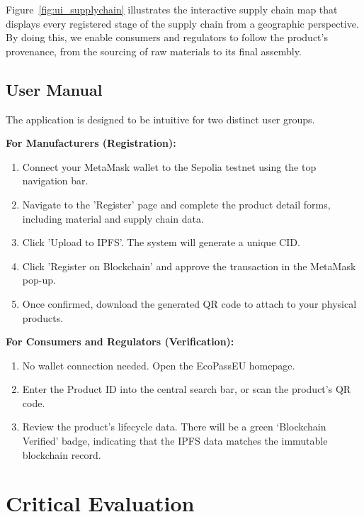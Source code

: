 \documentclass[runningheads]{llncs}
\begin{document}
	Figure~\ref{fig:ui_supplychain} illustrates the interactive supply chain 
	map that displays every registered stage of the supply chain from a 
	geographic perspective. By doing this, we enable consumers and regulators to follow the product's provenance, from the sourcing of raw materials to its final assembly.
	

	
	
	
	\subsection{User Manual}
	The application is designed to be intuitive for two distinct user groups. 
	
	\textbf{For Manufacturers (Registration):}
	\begin{enumerate}
		\item Connect your MetaMask wallet to the Sepolia testnet using the top navigation bar.
		\item Navigate to the 'Register' page and complete the product detail forms, including material and supply chain data.
		\item Click 'Upload to IPFS'. The system will generate a unique CID.
		\item Click 'Register on Blockchain' and approve the transaction in the MetaMask pop-up.
		\item Once confirmed, download the generated QR code to attach to your physical products.
	\end{enumerate}
	
	\textbf{For Consumers and Regulators (Verification):}
	\begin{enumerate}
		\item No wallet connection needed. Open the EcoPassEU homepage.
		\item Enter the Product ID into the central search bar, or scan the product's QR code.
		\item Review the product's lifecycle data. There will be a green `Blockchain Verified' badge, indicating that the IPFS data matches the immutable blockchain record.
	\end{enumerate}
	
	
	
	
	
	
	
	
	
	
	
	\section{Critical Evaluation}
	
\end{document}
